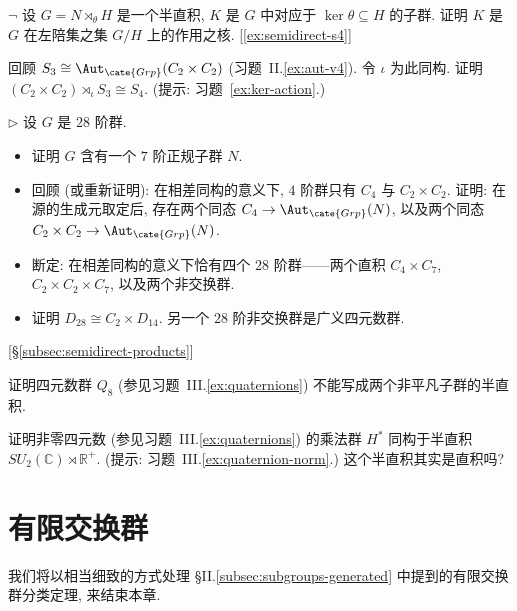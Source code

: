 \begin{prob}
\label{ex:ker-action}
$\neg$ 设 $G = N \rtimes_{\theta} H$ 是一个半直积, $K$ 是 $G$ 中对应于 $\ker \theta \subseteq H$ 的子群. 证明 $K$ 是 $G$ 在左陪集之集 $G/H$ 上的作用之核. [\ref{ex:semidirect-s4}]
\end{prob}

\begin{prob}
\label{ex:semidirect-s4}
回顾 $S_3 \cong \Aut_{\cate{Grp}}(C_2 \times C_2)$ (习题~II.\ref{ex:aut-v4}). 令 $\iota$ 为此同构. 证明 $(C_2 \times C_2) \rtimes_{\iota} S_3 \cong S_4$. (提示: 习题~\ref{ex:ker-action}.)
\end{prob}

\begin{prob}
\label{ex:order28}
$\triangleright$ 设 $G$ 是 $28$ 阶群.
\begin{itemize}
\item 证明 $G$ 含有一个 $7$ 阶正规子群 $N$.
\item 回顾 (或重新证明): 在相差同构的意义下, $4$ 阶群只有 $C_4$ 与 $C_2 \times C_2$. 证明: 在源的生成元取定后, 存在两个同态 $C_4 \to \Aut_{\cate{Grp}}(N)$, 以及两个同态 $C_2 \times C_2 \to \Aut_{\cate{Grp}}(N)$.
\item 断定: 在相差同构的意义下恰有四个 $28$ 阶群——两个直积 $C_4 \times C_7$, $C_2 \times C_2 \times C_7$, 以及两个非交换群.
\item 证明 $D_{28}\cong C_2\times D_{14}$. 另一个 $28$ 阶非交换群是广义四元数群.
\end{itemize}
[\S\ref{subsec:semidirect-products}]
\end{prob}

\begin{prob}
\label{ex:q8-not-semidirect}
证明四元数群 $Q_8$ (参见习题~III.\ref{ex:quaternions}) 不能写成两个非平凡子群的半直积.
\end{prob}

\begin{prob}
\label{ex:quaternion-semidirect}
证明非零四元数 (参见习题~III.\ref{ex:quaternions}) 的乘法群 $H^{*}$ 同构于半直积 $SU_2(\mathbb{C}) \rtimes \mathbb{R}^{+}$. (提示: 习题~III.\ref{ex:quaternion-norm}.) 这个半直积其实是直积吗?
\end{prob}

\section{有限交换群}
\label{sec:finite-abelian-groups}

我们将以相当细致的方式处理 \S II.\ref{subsec:subgroups-generated} 中提到的有限交换群分类定理, 来结束本章.

